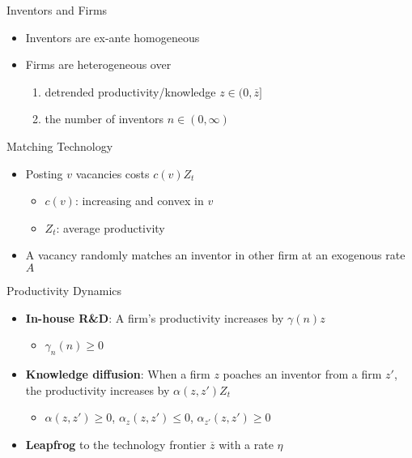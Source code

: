 \documentclass{beamer}
\begin{document}
\begin{frame}{Inventors and Firms}
  \begin{itemize}
    \setlength\itemsep{3mm}
    \item Inventors are ex-ante homogeneous
    \item Firms are heterogeneous over
          \begin{enumerate}
            \item detrended productivity/knowledge $z\in (0,\overline{z}]$
            \item the number of inventors $n \in (0,\infty)$
          \end{enumerate}
  \end{itemize}
\end{frame}

\begin{frame}{Matching Technology}

  \begin{itemize}
    \setlength\itemsep{3mm}
    \item Posting $v$ vacancies costs $c(v) Z_t$
          \begin{itemize}
            \item $c(v)$: increasing and convex in $v$
            \item $Z_t$: average productivity
          \end{itemize}
    \item A vacancy randomly matches an inventor in other firm at an exogenous rate $A$
  \end{itemize}

\end{frame}

\begin{frame}{Productivity Dynamics}

  \begin{itemize}
    \setlength\itemsep{3mm}
    \item {\bf In-house R\&D}: A firm's productivity increases by $\gamma(n)z$
          \begin{itemize}
            \item $\gamma_n(n) \geq 0$
          \end{itemize}
    \item {\bf Knowledge diffusion}: When a firm $z$ poaches an inventor from a firm $z'$,  the productivity increases by $\alpha(z,z')Z_t$
          \begin{itemize}
            \item  $\alpha(z,z')\geq 0$, $\alpha_z(z,z') \leq 0$, $\alpha_{z'}(z,z') \geq 0$
          \end{itemize}
    \item {\bf Leapfrog} to the technology frontier $\overline{z}$ with a rate $\eta$
  \end{itemize}

\end{frame}
\end{document}
